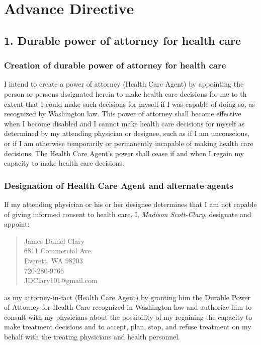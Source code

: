 \documentclass[oneside]{memoir}
\begin{document}
\section*{\Huge Advance Directive}\label{advance-directive}

\subsection{1. Durable power of attorney for health care}\label{durable-power-of-attorney-for-health-care}

\subsubsection{Creation of durable power of attorney for health care}\label{creation-of-durable-power-of-attorney-for-health-care}

I intend to create a power of attorney (Health Care Agent) by appointing the person or persons designated herein to make health care decisions for me to th extent that I could make such decisions for myself if I was capable of doing so, as recognized by Washington law. This power of attorney shall become effective when I become disabled and I cannot make health care decisions for myself as determined by my attending physician or designee, such as if I am unconscious, or if I am otherwise temporarily or permanently incapable of making health care decisions. The Health Care Agent's power shall cease if and when I regain my capacity to make health care decisions.

\subsubsection{Designation of Health Care Agent and alternate agents}\label{designation-of-health-care-agent-and-alternate-agents}

If my attending physician or his or her designee determines that I am not capable of giving informed consent to health care, I, \emph{Madison Scott-Clary}, designate and appoint:

\begin{quote}
    James Daniel Clary\\
    6811 Commercial Ave.\\
    Everett, WA 98203\\
    720-280-9766\\
    JDClary101@gmail.com
\end{quote}

\noindent as my attorney-in-fact (Health Care Agent) by granting him the Durable Power of Attorney for Health Care recognized in Washington law and authorize him to consult with my physicians about the possibility of my regaining the capacity to make treatment decisions and to accept, plan, stop, and refuse treatment on my behalf with the treating physicians and health personnel.
\end{document}
